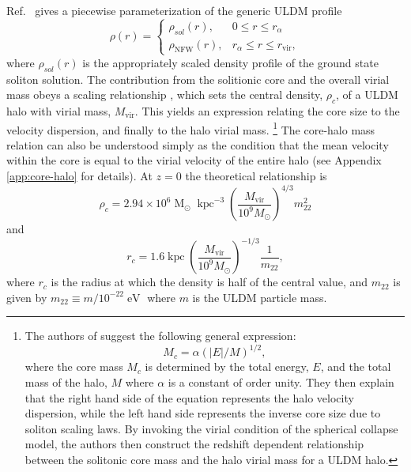 \documentclass[a4paper,11pt]{article}
\begin{document}
 
Ref.~\cite{Robles:2018fur} gives a piecewise parameterization of the generic ULDM profile 
%
\begin{equation}\label{eq:piecewise}
     \rho(r)=
    \begin{cases}
      \rho_{sol}(r), & 0\leq r \leq r_{\alpha} \\
      \rho_\mathrm{NFW}(r), & r_{\alpha}\leq r \leq r_{\mathrm{vir}},
    \end{cases}
\end{equation}
%
where $\rho_{sol}(r)$ is the appropriately scaled density profile of the ground state soliton solution. The contribution from the solitionic core and the overall virial mass  obeys a scaling relationship \cite{Schive:2014hza}, which sets the  central density, $\rho_c$, of a ULDM halo with virial mass, $M_{\mathrm{vir}}$.  This yields an expression relating the core size to the velocity dispersion, and finally to the halo virial mass.%
\footnote{The authors of \cite{Schive:2014hza} suggest the following general expression:
\begin{equation}
    M_c = \alpha \left(\vert E\vert/M\right)^{1/2},
\end{equation}
where the core mass $M_c$ is determined by the total energy, $E$, and the total mass of the halo, $M$ where $\alpha$ is a constant of order unity. They then explain that the right hand side of the equation represents the halo velocity dispersion, while the left hand side  represents the inverse core size due to soliton scaling laws. By invoking the virial condition of the spherical collapse model, the authors then  construct the redshift dependent relationship between the solitonic core mass and the halo virial mass for a ULDM halo.}
%
The core-halo mass relation can also be understood simply as the condition that the mean velocity within the core is equal to the virial velocity of the entire halo (see Appendix \ref{app:core-halo} for details). 
At $z=0$ the theoretical relationship is \cite{Schive:2014hza} 
%
\begin{equation}\label{eq:central_dens}
    \rho_c = 2.94\times10^6 \operatorname{M}_{\odot}\operatorname{kpc}^{-3}\left(\frac{M_{\mathrm{vir}}}{10^9 M_{\odot}}\right)^{4/3}m_{22}^{2}
\end{equation}
and 
\begin{equation}
    r_c = 1.6 \operatorname{kpc}\left(\frac{M_{\mathrm{vir}}}{10^9 M_{\odot}}\right)^{-1/3}\frac{1}{m_{22}},
\end{equation}
%
where $r_c$ is the radius at which the density is half of the central value, and $m_{22}$ is given by $m_{22} \equiv m / 10^{-22} \operatorname{eV}$ where $m$ is the ULDM particle mass. 
\end{document}
